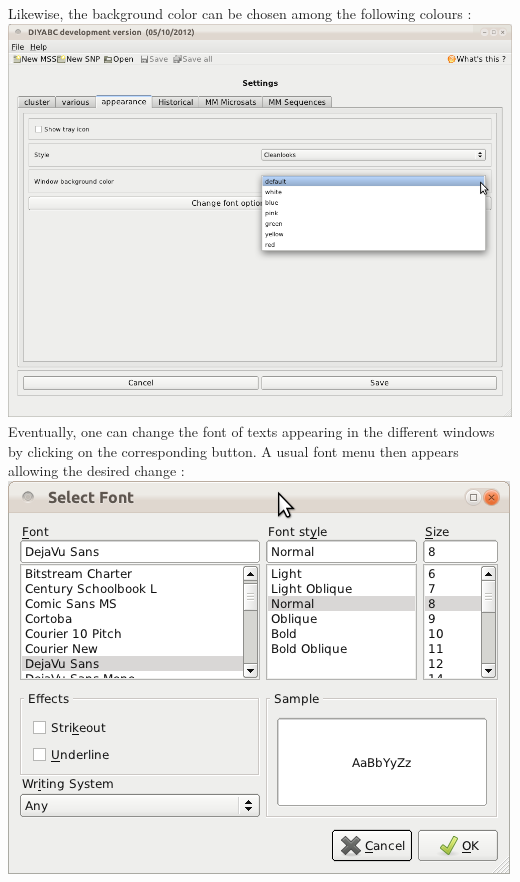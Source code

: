 Likewise, the background color can be chosen among the following colours :\\

\includegraphics[scale=0.33]{gui_pictures/Capture-DIYABC-100.png} \\

Eventually, one can change the font of texts appearing in the different windows by clicking on the corresponding button. A usual font menu then appears allowing the desired change :\\

\includegraphics[scale=0.33]{gui_pictures/Capture-DIYABC-101.png} \\



